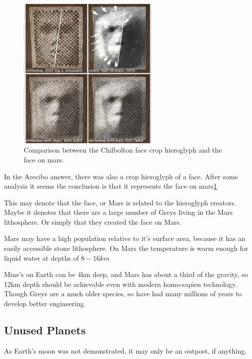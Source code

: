 \documentclass{report}
\begin{document}
\begin{figure}
  \centering
  \includegraphics[width=0.61\textwidth]{photograph/chilbolton_mars_face.jpg}
  \caption{Comparison between the Chilbolton face crop hieroglyph and the face on
mars.}\label{fig:marsface}
\end{figure}

In the Arecibo answer, there was also a crop hieroglyph of a face. After some
analysis it seems the conclusion is that it represents the face on
mars\ref{fig:marsface}\cite{chilbolton}

This may denote that the face, or Mars is related to the hieroglyph creators.
Maybe it denotes that there are a large number of Greys living in the Mars
lithosphere. Or simply that they created the face on Mars. 

Mars may have a high population relative to it's surface area, 
because it has an easily accessible stone lithosphere. On Mars the temperature
is warm enough for liquid water at depths of $8-16km$\cite{marswater}

Mine's on Earth can be 4km deep, and Mars has about a third of the gravity, so
12km depth should be achievable even with modern homo-sapien technology. Though
Greys are a much older species, so have had many millions of years to develop
better engineering.



\subsection{Unused Planets}

As Earth's moon was not demonstrated, it may only be an outpost, if anything.
\end{document}
